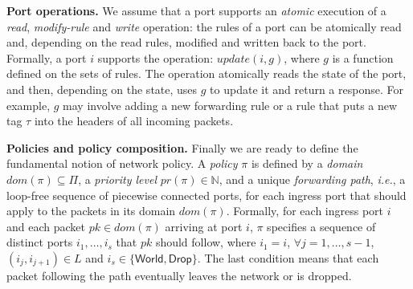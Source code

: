 \documentclass[11pt,pdftex,letter]{article}
\newcommand{\dom}{\textit{dom}}
\newcommand{\pr}{\textit{pr}}
\newcommand{\CPOs}{\textit{paths}}
\newcommand{\ie}{{\it i.e.}}
\newcommand{\pknote}[1]{\textcolor{heraldBlue}{\small \bf [PK: #1]}}
\newcommand{\pknote}[1]{}
\newcommand{\ignore}[1]{}
\begin{document}

\vspace{1mm}\noindent\textbf{Port operations.}
%
We assume that a port supports an \emph{atomic} execution of a \textit{read}, \textit{modify-rule}
and \textit{write} operation: the rules of a port can be atomically read and, depending
on the read rules, modified and written back to the port.
Formally, a port $i$ supports the operation:
$\textit{update}(i,g)$, where $g$ is a function defined on the
sets of rules.
The operation atomically reads the state of the port, and then, depending
on the state, uses $g$ to update it and return a response.
For example, $g$ may involve adding a new forwarding rule or
a rule that puts a new tag $\tau$ into the headers
of all incoming packets.

\ignore{
In Section~\ref{sec:discussion}, we give a valency proof that
under a weaker port model of atomic reads and writes,
the CPC Problem is impossible to solve.
}



\vspace{1mm}\noindent\textbf{Policies and policy composition.}
Finally we are ready to define the fundamental notion of network policy.
A \emph{policy} $\pi$ is defined by a \emph{domain} $\dom(\pi)\subseteq
\Pi$, a \emph{priority level} $\pr(\pi) \in\mathbb{N}$, and a unique
\emph{forwarding path}, \ie, a loop-free sequence of piecewise connected ports,
for each ingress port that should apply to the packets in its domain
$\textit{dom}(\pi)$. Formally, for each ingress port $i$ and each packet
$pk\in\dom(\pi)$ arriving at port $i$, $\pi$ specifies a sequence of distinct
ports $i_1,\ldots,i_s$ that $pk$ should follow, where $i_1=i$, $\forall
j=1,\ldots,s-1$, $(i_j,i_{j+1})\in L$ and
$i_s\in\{\textsf{World},\textsf{Drop}\}$.
%
The last condition means that each packet following the path
eventually leaves the network or is dropped.
\end{document}
